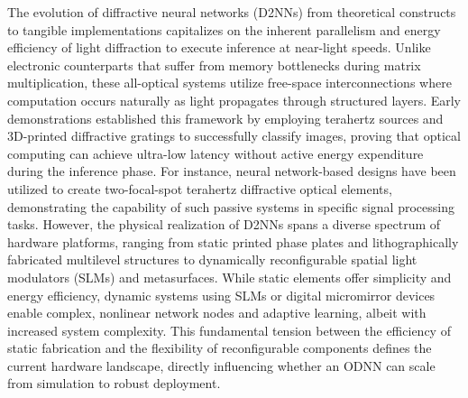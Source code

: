 The evolution of diffractive neural networks (D2NNs) from theoretical constructs to tangible implementations capitalizes on the inherent parallelism and energy efficiency of light diffraction to execute inference at near-light speeds. Unlike electronic counterparts that suffer from memory bottlenecks during matrix multiplication, these all-optical systems utilize free-space interconnections where computation occurs naturally as light propagates through structured layers. Early demonstrations established this framework by employing terahertz sources and 3D-printed diffractive gratings to successfully classify images, proving that optical computing can achieve ultra-low latency without active energy expenditure during the inference phase. For instance, neural network-based designs have been utilized to create two-focal-spot terahertz diffractive optical elements, demonstrating the capability of such passive systems in specific signal processing tasks. \citep{doi_10_1109_tthz_2023_3344020_a0a550ba} However, the physical realization of D2NNs spans a diverse spectrum of hardware platforms, ranging from static printed phase plates and lithographically fabricated multilevel structures to dynamically reconfigurable spatial light modulators (SLMs) and metasurfaces. While static elements offer simplicity and energy efficiency, dynamic systems using SLMs or digital micromirror devices enable complex, nonlinear network nodes and adaptive learning, albeit with increased system complexity. This fundamental tension between the efficiency of static fabrication and the flexibility of reconfigurable components defines the current hardware landscape, directly influencing whether an ODNN can scale from simulation to robust deployment. \citep{doi_10_1155_2021_6667495_60f04b14} \citep{doi_10_1364_josab_497148_b087424b}

